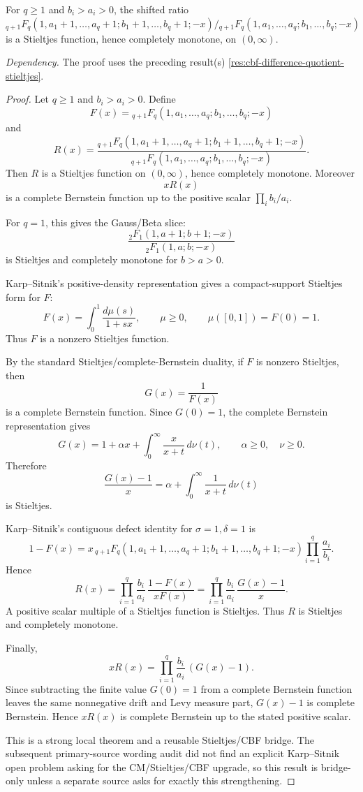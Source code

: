 \begin{proposition}
\label{res:ks-general-q-delta1-sigma1-ratio-stieltjes-cm}
For \(q\ge1\) and \(b_i>a_i>0\), the shifted ratio \({}_{q+1}F_q(1,a_1+1,\ldots,a_q+1;b_1+1,\ldots,b_q+1;-x)/{}_{q+1}F_q(1,a_1,\ldots,a_q;b_1,\ldots,b_q;-x)\) is a Stieltjes function, hence completely monotone, on \((0,\infty)\).

\emph{Dependency.} The proof uses the preceding result(s) \ref{res:cbf-difference-quotient-stieltjes}.
\end{proposition}
\begin{proof}
Let \(q\ge1\) and \(b_i>a_i>0\). Define
\[
F(x)={}_{q+1}F_q(1,a_1,\ldots,a_q;b_1,\ldots,b_q;-x)
\]
and
\[
R(x)=
\frac{{}_{q+1}F_q(1,a_1+1,\ldots,a_q+1;b_1+1,\ldots,b_q+1;-x)}
{{}_{q+1}F_q(1,a_1,\ldots,a_q;b_1,\ldots,b_q;-x)}.
\]
Then \(R\) is a Stieltjes function on \((0,\infty)\), hence completely monotone. Moreover
\[
xR(x)
\]
is a complete Bernstein function up to the positive scalar \(\prod_i b_i/a_i\).

For \(q=1\), this gives the Gauss/Beta slice:
\[
\frac{{}_2F_1(1,a+1;b+1;-x)}{{}_2F_1(1,a;b;-x)}
\]
is Stieltjes and completely monotone for \(b>a>0\).

Karp--Sitnik's positive-density representation gives a compact-support Stieltjes form for \(F\):
\[
F(x)=\int_0^1 \frac{d\mu(s)}{1+sx},
\qquad \mu\ge0,
\qquad \mu([0,1])=F(0)=1.
\]
Thus \(F\) is a nonzero Stieltjes function.

By the standard Stieltjes/complete-Bernstein duality, if \(F\) is nonzero Stieltjes, then
\[
G(x)=\frac1{F(x)}
\]
is a complete Bernstein function. Since \(G(0)=1\), the complete Bernstein representation gives
\[
G(x)=1+\alpha x+\int_0^\infty \frac{x}{x+t}\,d\nu(t),
\qquad \alpha\ge0,\quad \nu\ge0.
\]
Therefore
\[
\frac{G(x)-1}{x}
=\alpha+\int_0^\infty \frac{1}{x+t}\,d\nu(t)
\]
is Stieltjes.

Karp--Sitnik's contiguous defect identity for \(\sigma=1,\delta=1\) is
\[
1-F(x)
=x\,{}_{q+1}F_q(1,a_1+1,\ldots,a_q+1;b_1+1,\ldots,b_q+1;-x)
\prod_{i=1}^q\frac{a_i}{b_i}.
\]
Hence
\[
R(x)=
\prod_{i=1}^q\frac{b_i}{a_i}\,
\frac{1-F(x)}{xF(x)}
=
\prod_{i=1}^q\frac{b_i}{a_i}\,
\frac{G(x)-1}{x}.
\]
A positive scalar multiple of a Stieltjes function is Stieltjes. Thus \(R\) is Stieltjes and completely monotone.

Finally,
\[
xR(x)=\prod_{i=1}^q\frac{b_i}{a_i}\,(G(x)-1).
\]
Since subtracting the finite value \(G(0)=1\) from a complete Bernstein function leaves the same nonnegative drift and Levy measure part, \(G(x)-1\) is complete Bernstein. Hence \(xR(x)\) is complete Bernstein up to the stated positive scalar.

This is a strong local theorem and a reusable Stieltjes/CBF bridge. The subsequent primary-source wording audit did not find an explicit Karp--Sitnik open problem asking for the CM/Stieltjes/CBF upgrade, so this result is bridge-only unless a separate source asks for exactly this strengthening.
\end{proof}


